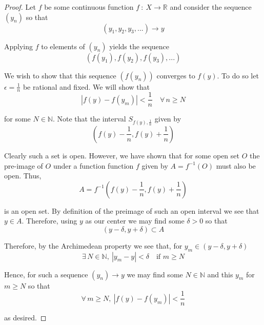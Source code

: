 \documentclass[12pt]{article}
\newlength\tindent
\renewcommand{\indent}{\hspace*{\tindent}}
\newcommand{\R}{\mathbb R}
\newcommand{\N}{\mathbb N}
\begin{document}
\begin{proof} Let $f$ be some continuous function $f~:~X\to\R$ and consider the sequence $(y_n)$ so that
\begin{equation*}
	(y_1, y_2, y_3, ...) \longrightarrow y
\end{equation*}

Applying $f$ to elements of $(y_n)$ yields the sequence
\begin{equation*}
	(f(y_1), f(y_2), f(y_3), ...) 
\end{equation*}

We wish to show that this sequence $(f(y_n))$ converges to $f(y)$. To do so let $\epsilon = \frac{1}{n}$ be rational and fixed. We will show that
\begin{equation*}
	|f(y) - f(y_m)| < \frac{1}{n} \quad \forall\,n\geq N
\end{equation*}

for some $N \in \N$. Note that the interval $S_{f(y), \frac{1}{n}}$ given by
\begin{equation*}
	\left( f(y) - \frac{1}{n}, f(y) + \frac{1}{n} \right)
\end{equation*}

\indent Clearly such a set is open. However, we have shown that for some open set $O$ the pre-image of $O$ under a function function $f$ given by $A = f^{-1}(O)$ must also be open. Thus,
\begin{equation*}
	A = f^{-1}\left( f(y) - \frac{1}{n}, f(y) + \frac{1}{n} \right)
\end{equation*}

is an open set. By definition of the preimage of such an open interval we see that $y \in A$. Therefore, using $y$ as our center we may find some $\delta > 0$ so that
\begin{equation*}
	(y - \delta, y + \delta) \subset A
\end{equation*}

Therefore, by the Archimedean property we see that, for $y_m \in (y - \delta, y + \delta)$
\begin{equation*}
	\exists\,N\in\N,~ |y_m - y| < \delta \quad \text{if $m \geq N$}
\end{equation*}

\indent Hence, for such a sequence $(y_n) \longrightarrow y$ we may find some $N \in \N$ and this $y_m$ for $m \geq N$ so that
\begin{equation*}
	\forall\,m\geq N,~ |f(y) - f(y_m)| < \frac{1}{n}
\end{equation*}

as desired.
\end{proof}
\end{document}
